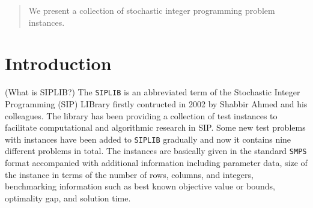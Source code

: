 \author{Yongkyu Cho \and 
		Kibaek Kim \and
        Cong Han Lim \and
        James Luedtke \and
        Jeffrey Linderoth
}



\date{Received: date / Accepted: date}


\maketitle

\begin{abstract}
We present a collection of stochastic integer programming problem instances.
\end{abstract}

\section{Introduction}
(What is SIPLIB?) The \texttt{SIPLIB} \cite{web:SIPLIB1} is an abbreviated term of the Stochastic Integer Programming (SIP) LIBrary firstly contructed in 2002 by Shabbir Ahmed and his colleagues. The library has been providing a collection of test instances to facilitate computational and algorithmic research in SIP. Some new test problems with instances have been added to \texttt{SIPLIB} gradually and now it contains nine different problems in total.  The instances are basically given in the standard \texttt{SMPS} format accompanied with additional information including parameter data, size of the instance in terms of the number of rows, columns, and integers, benchmarking information such as best known objective value or bounds, optimality gap, and solution time.

